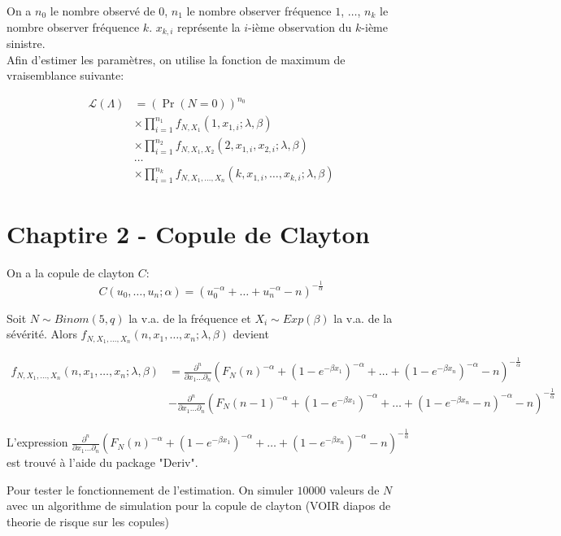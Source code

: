 \documentclass{article}
\begin{document}
	On a $n_0$ le nombre observé de $0$, $n_1$ le nombre observer fréquence $1$, $\dots$, $n_k$ le nombre observer fréquence $k$.
	$x_{k,i}$ représente la $i$-ième observation du $k$-ième sinistre.\\
	Afin d'estimer les paramètres, on utilise la fonction de maximum de vraisemblance suivante:
	
	\begin{align*}
	 \mathcal{L}(\Lambda) &= \left( \Pr (N=0)\right)^{n_0} \\
	 & \times \prod_{i = 1}^{n_1} f_{N,X_1}(1,x_{1,i};\lambda,\beta)\\
	 & \times \prod_{i = 1}^{n_2} f_{N,X_1,X_2}(2,x_{1,i},x_{2,i};\lambda,\beta)\\
	 & \dots\\
	 & \times \prod_{i = 1}^{n_k} f_{N,X_1,\dots,X_n}(k,x_{1,i},\dots,x_{k,i};\lambda,\beta)
	\end{align*}
	
	\section{Chaptire 2 - Copule de Clayton}	
	On a la copule de clayton $C$:
	$$C(u_0,\dots,u_n;\alpha) = (  u_0^{-\alpha} + \dots + u_n^{-\alpha} - n)^{-\frac{1}{\alpha}}$$
	
	Soit $N \sim Binom(5,q)$ la v.a. de la fréquence et $X_i \sim Exp(\beta)$ la v.a. de la sévérité. 
	Alors $	f_{N,X_1,\dots,X_n}(n,x_1,\dots,x_n;\lambda,\beta)$ devient
	
	\begin{align*}
		f_{N,X_1,\dots,X_n}(n,x_1,\dots,x_n;\lambda,\beta) &= \frac{\partial^n}{\partial x_1 \dots \partial_n} (  F_N(n)^{-\alpha} + (1-e^{-\beta x_1})^{-\alpha} + \dots + (1-e^{-\beta x_n} )^{-\alpha} - n)^{-\frac{1}{\alpha}}\\
		&   - \frac{\partial^n}{\partial x_1 \dots \partial_n}(  F_N(n-1)^{-\alpha} + (1-e^{-\beta x_1})^{-\alpha} + \dots + (1-e^{-\beta x_n} - n)^{-\alpha} - n)^{-\frac{1}{\alpha}}
	\end{align*}
	
	L'expression $\frac{\partial^n}{\partial x_1 \dots \partial_n} (  F_N(n)^{-\alpha} + (1-e^{-\beta x_1})^{-\alpha} + \dots + (1-e^{-\beta x_n} )^{-\alpha} - n)^{-\frac{1}{\alpha}}$ est trouvé à l'aide du package "Deriv".
	
	Pour tester le fonctionnement de l'estimation. On simuler $10000$ valeurs de $N$ avec un algorithme de simulation pour la copule de clayton (VOIR diapos de theorie de risque sur les copules)
	
\end{document}
